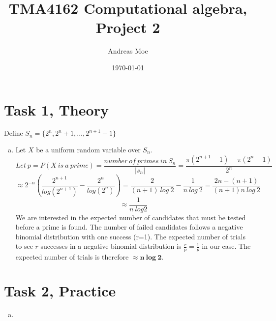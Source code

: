 \documentclass[12pt,a4paper]{article}
\title{TMA4162 Computational algebra, Project 2}
\author{Andreas Moe}
\date{\today}
\begin{document}
\maketitle

\section*{Task 1, Theory}
Define \(S_n = \{2^n, 2^n+1, ... , 2^{n+1}-1\}\)
\begin{enumerate}[a)]
    \item 
    Let \(X\) be a uniform random variable over \(S_n\).
    \[
    Let\ p = P(X\ is\ a\ prime) = \frac{number\ of\ primes\ in\ S_n}{|s_n|}
    = \frac{\pi(2^{n+1}-1) - \pi(2^n-1)}{2^n} \]
    \[\approx 
    2^{-n}\left(\frac{2^{n+1}}{log(2^{n+1})}-\frac{2^n}{log(2^n)}\right)
    = \frac{2}{(n+1)\ log\ 2}-\frac{1}{n\ log\ 2}
    = \frac{2n - (n+1)}{(n+1)n\ log\ 2}
    \]
    \[
    \approx \frac{1}{n\ log 2}
    \]
    We are interested in the expected number of candidates that must be tested before a prime is found. The number of failed candidates follows a negative binomial distribution with one success (r=1). The expected number of trials to see \(r\) successes in a negative binomial distribution is \(\frac{r}{p} = \frac{1}{p}\) in our case.
    The expected number of trials is therefore \(\approx \mathbf{n\ log\ 2}\).

    \begin{table}[H]
        
    \end{table}

    \end{enumerate}

\section*{Task 2, Practice}

\begin{enumerate}[a)]
    \item 

\end{enumerate}
\end{document}
